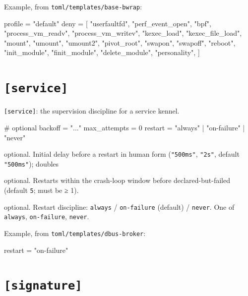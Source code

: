 Example, from \texttt{toml/templates/base-bwrap}:

\begin{kennelcode}
[seccomp]
profile = "default"
deny = [
    "userfaultfd", "perf_event_open", "bpf",
    "process_vm_readv", "process_vm_writev",
    "kexec_load", "kexec_file_load",
    "mount", "umount", "umount2", "pivot_root",
    "swapon", "swapoff", "reboot",
    "init_module", "finit_module", "delete_module",
    "personality",
]
\end{kennelcode}

\hypertarget{service}{%
\section{\texorpdfstring{\texttt{{[}service{]}}}{{[}service{]}}}\label{service}}

\texttt{{[}service{]}}: the supervision discipline for a service kennel.

\begin{kennelcode}
[service]
# optional
backoff  = "..."
max_attempts = 0
restart  = "always" | "on-failure" | "never"
\end{kennelcode}

\begin{description}
\tightlist
\item[\texttt{backoff}]
optional. Initial delay before a restart in human form
(\texttt{"500ms"}, \texttt{"2s"}, default \texttt{"500ms"}); doubles
\item[\texttt{max\_attempts}]
optional. Restarts within the crash-loop window before
declared-but-failed (default \texttt{5}; must be ≥ 1).
\item[\texttt{restart}]
optional. Restart discipline: \texttt{always} / \texttt{on-failure}
(default) / \texttt{never}. One of \texttt{always}, \texttt{on-failure},
\texttt{never}.
\end{description}

Example, from \texttt{toml/templates/dbus-broker}:

\begin{kennelcode}
[service]
restart = "on-failure"
\end{kennelcode}

\hypertarget{signature}{%
\section{\texorpdfstring{\texttt{{[}signature{]}}}{{[}signature{]}}}\label{signature}}

